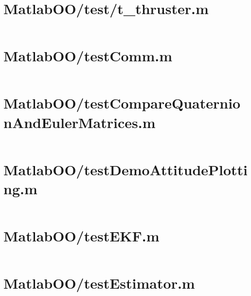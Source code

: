 \pagebreak
\section*{MatlabOO/test/t\_thruster.m}\label{code:MatlabOO/test/t_thruster.m}
\inputminted[linenos,fontsize=\scriptsize]{matlab}{/home/dcouture/git/mathyourlife/TSatPy/beta_versions/matlab_object_oriented/test/t_thruster.m}

\pagebreak
\section*{MatlabOO/testComm.m}\label{code:MatlabOO/testComm.m}
\inputminted[linenos,fontsize=\scriptsize]{matlab}{/home/dcouture/git/mathyourlife/TSatPy/beta_versions/matlab_object_oriented/testComm.m}

\pagebreak
\section*{MatlabOO/testCompareQuaternionAndEulerMatrices.m}\label{code:MatlabOO/testCompareQuaternionAndEulerMatrices.m}
\inputminted[linenos,fontsize=\scriptsize]{matlab}{/home/dcouture/git/mathyourlife/TSatPy/beta_versions/matlab_object_oriented/testCompareQuaternionAndEulerMatrices.m}

\pagebreak
\section*{MatlabOO/testDemoAttitudePlotting.m}\label{code:MatlabOO/testDemoAttitudePlotting.m}
\inputminted[linenos,fontsize=\scriptsize]{matlab}{/home/dcouture/git/mathyourlife/TSatPy/beta_versions/matlab_object_oriented/testDemoAttitudePlotting.m}

\pagebreak
\section*{MatlabOO/testEKF.m}\label{code:MatlabOO/testEKF.m}
\inputminted[linenos,fontsize=\scriptsize]{matlab}{/home/dcouture/git/mathyourlife/TSatPy/beta_versions/matlab_object_oriented/testEKF.m}

\pagebreak
\section*{MatlabOO/testEstimator.m}\label{code:MatlabOO/testEstimator.m}
\inputminted[linenos,fontsize=\scriptsize]{matlab}{/home/dcouture/git/mathyourlife/TSatPy/beta_versions/matlab_object_oriented/testEstimator.m}

